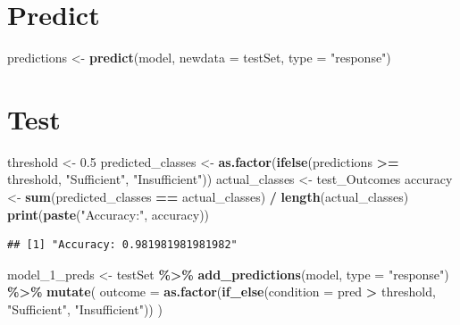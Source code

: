 \documentclass[
  11pt,
]{article}
\newenvironment{Shaded}{\begin{snugshade}}{\end{snugshade}}
\newcommand{\AttributeTok}[1]{\textcolor[rgb]{0.13,0.29,0.53}{#1}}
\newcommand{\FloatTok}[1]{\textcolor[rgb]{0.00,0.00,0.81}{#1}}
\newcommand{\FunctionTok}[1]{\textcolor[rgb]{0.13,0.29,0.53}{\textbf{#1}}}
\newcommand{\NormalTok}[1]{#1}
\newcommand{\OtherTok}[1]{\textcolor[rgb]{0.56,0.35,0.01}{#1}}
\newcommand{\SpecialCharTok}[1]{\textcolor[rgb]{0.81,0.36,0.00}{\textbf{#1}}}
\newcommand{\StringTok}[1]{\textcolor[rgb]{0.31,0.60,0.02}{#1}}
\begin{document}
\hypertarget{predict}{%
\section{Predict}\label{predict}}

\begin{Shaded}
\begin{Highlighting}[]
\NormalTok{predictions }\OtherTok{\textless{}{-}} \FunctionTok{predict}\NormalTok{(model, }\AttributeTok{newdata =}\NormalTok{ testSet, }\AttributeTok{type =} \StringTok{"response"}\NormalTok{)}
\end{Highlighting}
\end{Shaded}

\hypertarget{test}{%
\section{Test}\label{test}}

\begin{Shaded}
\begin{Highlighting}[]
\NormalTok{threshold }\OtherTok{\textless{}{-}} \FloatTok{0.5}  
\NormalTok{predicted\_classes }\OtherTok{\textless{}{-}} \FunctionTok{as.factor}\NormalTok{(}\FunctionTok{ifelse}\NormalTok{(predictions }\SpecialCharTok{\textgreater{}=}\NormalTok{ threshold, }\StringTok{"Sufficient"}\NormalTok{, }\StringTok{"Insufficient"}\NormalTok{))}
\NormalTok{actual\_classes }\OtherTok{\textless{}{-}}\NormalTok{ test\_Outcomes}
\NormalTok{accuracy }\OtherTok{\textless{}{-}} \FunctionTok{sum}\NormalTok{(predicted\_classes }\SpecialCharTok{==}\NormalTok{ actual\_classes) }\SpecialCharTok{/} \FunctionTok{length}\NormalTok{(actual\_classes)}
\FunctionTok{print}\NormalTok{(}\FunctionTok{paste}\NormalTok{(}\StringTok{"Accuracy:"}\NormalTok{, accuracy))}
\end{Highlighting}
\end{Shaded}

\begin{verbatim}
## [1] "Accuracy: 0.981981981981982"
\end{verbatim}

\begin{Shaded}
\begin{Highlighting}[]
\NormalTok{model\_1\_preds }\OtherTok{\textless{}{-}}\NormalTok{ testSet }\SpecialCharTok{\%\textgreater{}\%}
  \FunctionTok{add\_predictions}\NormalTok{(model, }\AttributeTok{type =} \StringTok{"response"}\NormalTok{) }\SpecialCharTok{\%\textgreater{}\%}
  \FunctionTok{mutate}\NormalTok{(}
    \AttributeTok{outcome =} \FunctionTok{as.factor}\NormalTok{(}\FunctionTok{if\_else}\NormalTok{(}\AttributeTok{condition =}\NormalTok{ pred }\SpecialCharTok{\textgreater{}}\NormalTok{ threshold, }
                      \StringTok{"Sufficient"}\NormalTok{, }\StringTok{"Insufficient"}\NormalTok{))}
\NormalTok{  )}
\end{Highlighting}
\end{Shaded}
\end{document}
